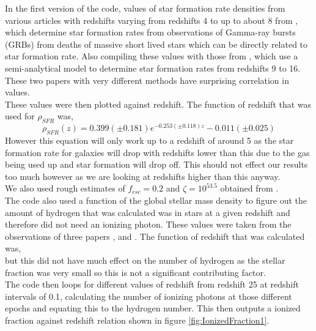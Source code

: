 \documentclass{article}
\begin{document}
\indent In the first version of the code, values of star formation rate densities from  various articles with redshifts varying from redshifts 4 to up to about 8 from \cite{2010MNRAS.401.2561W}, which determine star formation rates from observations of Gamma-ray bursts (GRBs) from deaths of massive short lived stars which can be directly related to star formation rate. Also compiling these values with those from \cite{2012ApJ...759L..38A}, which use a semi-analytical model to determine star formation rates from redshifts 9 to 16. These two papers with very different methods have surprising correlation in values.\\
These values were then plotted against redshift. The function of redshift that was used for $\rho_{SFR}$ was,
\begin{equation}
\rho_{SFR}(z)=0.399(\pm0.181)e^{-0.253(\pm0.118)z}-0.011(\pm0.025)
\end{equation}
However this equation will only work up to a redshift of around 5 as the star formation rate for galaxies will drop with redshifts lower than this due to the gas being used up and star formation will drop off. This should not effect our results too much however as we are looking at redshifts higher than this anyway.\\
We also used rough estimates of $f_{esc}=0.2$ and $\zeta=10^{53.5}$ obtained from \cite{2010Natur.468...49R}.\\
\indent The code also used a function of the global stellar mass density to figure out the amount of hydrogen that was calculated was in stars at a given redshift and therefore did not need an ionizing photon. These values were taken from the observations of three papers \cite{2006A&A...459..745F}, \cite{2003A&A...401...73W} and \cite{2003ApJS..149..289B}. The function of redshift that was calculated was,\\
\begin{equation}

\end{equation}
but this did not have much effect on the number of hydrogen as the stellar fraction was very small so this is not a significant contributing factor.\\
\indent The code then loops for different values of redshift from redshift 25 at redshift intervals of 0.1, calculating the number of ionizing photons at those different epochs and equating this to the hydrogen number. This then outputs a ionized fraction against redshift relation shown in figure \ref{fig:IonizedFraction1}.\\
\end{document}
